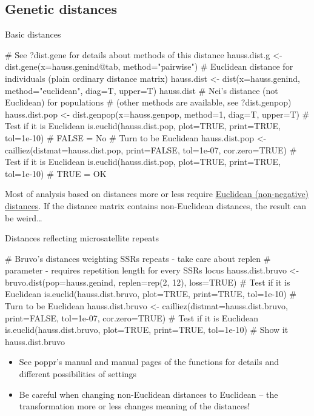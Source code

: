 \documentclass[compress, ucs, xelatex, 11pt, xcolor=svgnames,
  hyperref={
    bookmarks=true,
    unicode=true,
    colorlinks=true,
    pdftitle={Molecular data in R},
    plainpages=false,
    pdfauthor={Vojtech Zeisek},
    pdfsubject={Course about phylogeny and evolution in R},
    pdfcreator={XeLaTeX},
    pdfkeywords={R, evolution, phylogeny, molecular data},
    linkcolor=Tomato,
    anchorcolor=SaddleBrown,
    citecolor=Goldenrod,
    filecolor=DarkMagenta,
    menucolor=Sienna,
    urlcolor=DarkTurquoise,
    pdftex},
  url={hyphens, lowtilde} %
  ]{beamer}
\begin{document}
\subsection{Genetic distances}

\begin{frame}[fragile]{Basic distances}
  \begin{spluscode}
    # See ?dist.gene for details about methods of this distance
    hauss.dist.g <- dist.gene(x=hauss.genind@tab, method="pairwise")
    # Euclidean distance for individuals (plain ordinary distance matrix)
    hauss.dist <- dist(x=hauss.genind, method="euclidean", diag=T, upper=T)
    hauss.dist
    # Nei's distance (not Euclidean) for populations
    # (other methods are available, see ?dist.genpop)
    hauss.dist.pop <- dist.genpop(x=hauss.genpop, method=1, diag=T, upper=T)
    # Test if it is Euclidean
    is.euclid(hauss.dist.pop, plot=TRUE, print=TRUE, tol=1e-10) # FALSE = No
    # Turn to be Euclidean
    hauss.dist.pop <- cailliez(distmat=hauss.dist.pop, print=FALSE,
      tol=1e-07, cor.zero=TRUE)
    # Test if it is Euclidean
    is.euclid(hauss.dist.pop, plot=TRUE, print=TRUE, tol=1e-10) # TRUE = OK
  \end{spluscode}
Most of analysis based on distances more or less require \href{https://en.wikipedia.org/wiki/Euclidean_distance_matrix}{Euclidean (non-negative) distances}. If the distance matrix contains non-Euclidean distances, the result can be weird\ldots
\end{frame}

\begin{frame}[fragile]{Distances reflecting microsatellite repeats}
  \begin{spluscode}
    # Bruvo's distances weighting SSRs repeats - take care about replen
    # parameter - requires repetition length for every SSRs locus
    hauss.dist.bruvo <- bruvo.dist(pop=hauss.genind, replen=rep(2, 12),
      loss=TRUE)
    # Test if it is Euclidean
    is.euclid(hauss.dist.bruvo, plot=TRUE, print=TRUE, tol=1e-10)
    # Turn to be Euclidean
    hauss.dist.bruvo <- cailliez(distmat=hauss.dist.bruvo, print=FALSE,
      tol=1e-07, cor.zero=TRUE)
    # Test if it is Euclidean
    is.euclid(hauss.dist.bruvo, plot=TRUE, print=TRUE, tol=1e-10)
    # Show it
    hauss.dist.bruvo
  \end{spluscode}
  \begin{itemize}
    \item See poppr's manual and manual pages of the functions for details and different possibilities of settings
    \item Be careful when changing non-Euclidean distances to Euclidean -- \alert{the transformation more or less changes meaning of the distances!}
  \end{itemize}
\end{frame}
\end{document}
